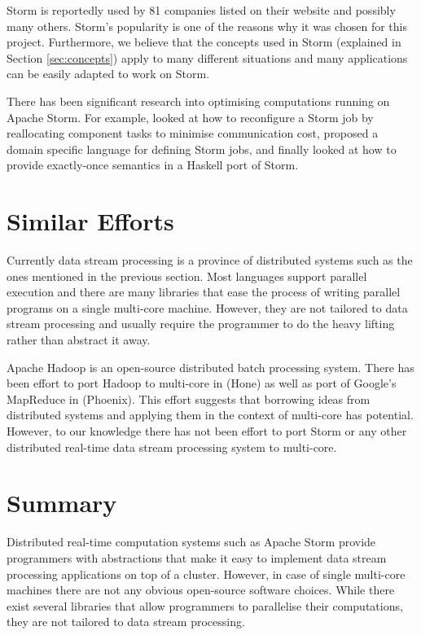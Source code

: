 Storm is reportedly used by 81 companies listed on their website \cite{PoweredBy} and possibly many others. Storm's popularity is one of the reasons why it was chosen for this project. Furthermore, we believe that the concepts used in Storm (explained in Section \ref{sec:concepts}) apply to many different situations and many applications can be easily adapted to work on Storm.

There has been significant research into optimising computations running on Apache Storm. For example, \cite{Chatzistergiou:2014:FHN:2661829.2661882} looked at how to reconfigure a Storm job by reallocating component tasks to minimise communication cost, \cite{DBLP:conf/fedcsis/ChandrasekaranSA14} proposed a domain specific language for defining Storm jobs, and finally \cite{dimsonhailstorm} looked at how to provide exactly-once semantics in a Haskell port of Storm.

\section{Similar Efforts}
\label{sec:similar_efforts}

Currently data stream processing is a province of distributed systems such as the ones mentioned in the previous section. Most languages support parallel execution and there are many libraries that ease the process of writing parallel programs on a single multi-core machine. However, they are not tailored to data stream processing and usually require the programmer to do the heavy lifting rather than abstract it away.

Apache Hadoop is an open-source distributed batch processing system. There has been effort to port Hadoop to multi-core in \citep{Kumar:2013:HSD:2536274.2536314} (Hone) as well as port of Google's MapReduce in \citep{ranger2007evaluating} (Phoenix). This effort suggests that borrowing ideas from distributed systems and applying them in the context of multi-core has potential. However, to our knowledge there has not been effort to port Storm or any other distributed real-time data stream processing system to multi-core.

\section{Summary}

Distributed real-time computation systems such as Apache Storm provide programmers with abstractions that make it easy to implement data stream processing applications on top of a cluster. However, in case of single multi-core machines there are not any obvious open-source software choices. While there exist several libraries that allow programmers to parallelise their computations, they are not tailored to data stream processing.
